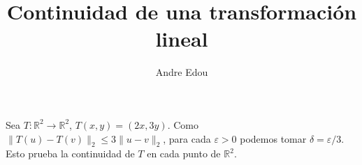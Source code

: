 \documentclass[12pt]{article}
\title{Continuidad de una transformación lineal}
\author{Andre Edou}
\date{}
\begin{document}
\maketitle
Sea $T:\mathbb{R}^2\to\mathbb{R}^2$, $T(x,y)=(2x,3y)$.
Como $\|T(u)-T(v)\|_2\leq 3\|u-v\|_2$, para cada
$\varepsilon>0$ podemos tomar $\delta=\varepsilon/3$.
Esto prueba la continuidad de $T$ en cada punto de $\mathbb{R}^2$.
\end{document}
